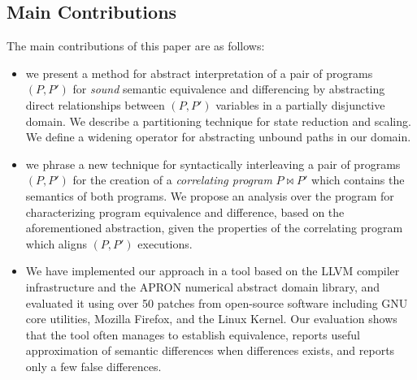 \subsection{Main Contributions}
The main contributions of this paper are as follows:
\begin{itemize}
\item we present a method for abstract interpretation of a pair of programs $(P,P')$ for \emph{sound} semantic equivalence and differencing by abstracting direct relationships between $(P,P')$ variables in a partially disjunctive domain. We describe a partitioning technique for state reduction and scaling. We define a widening operator for abstracting unbound paths in our domain.
\item we phrase a new technique for syntactically interleaving a pair of programs $(P,P')$ for the creation of a \emph{correlating program} $P \bowtie P'$ which contains the semantics of both programs. We propose an analysis over the program for characterizing program equivalence and difference, based on the aforementioned abstraction, given the properties of the correlating program which aligns $(P,P')$ executions.
\item We have implemented our approach in a tool based on the LLVM compiler infrastructure and the APRON numerical abstract
    domain library, and evaluated it using over 50 patches from open-source software including GNU core utilities, Mozilla
    Firefox, and the Linux Kernel. Our evaluation shows that the tool often manages to establish equivalence, reports useful
    approximation of semantic differences when differences exists, and reports only a few false differences.
\end{itemize}


